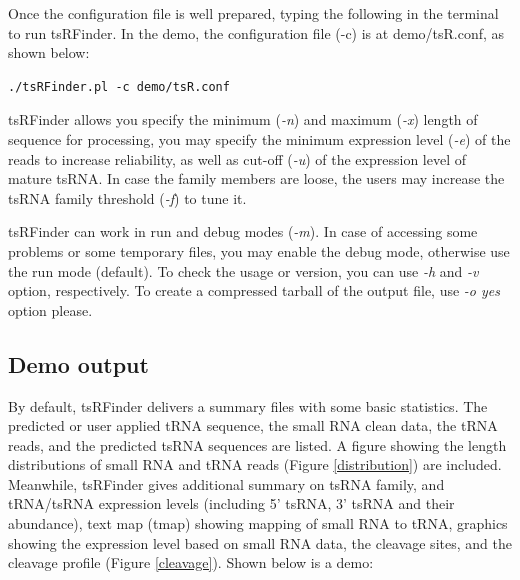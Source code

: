 \documentclass[11pt, a4paper]{article}
\begin{document}
Once the configuration file is well prepared, typing the following in the terminal to run tsRFinder. In the demo, the configuration file (-c) is at demo/tsR.conf, as shown below:

{\footnotesize \begin{tcolorbox}[colback=blue!5!white,colframe=blue!75!black,title=Running tsRFinder demo]
\begin{verbatim}
./tsRFinder.pl -c demo/tsR.conf
\end{verbatim}
\end{tcolorbox}}

tsRFinder allows you specify the minimum (\emph{-n}) and maximum (\emph{-x}) length of sequence for processing, you may specify the minimum expression level (\emph{-e}) of the reads to increase reliability, as well as cut-off (\emph{-u}) of the expression level of mature tsRNA. In case the family members are loose, the users may increase the tsRNA family threshold (\emph{-f}) to tune it.

tsRFinder can work in run and debug modes (\emph{-m}). In case of accessing some problems or some temporary files, you may enable the debug mode, otherwise use the run mode (default). To check the usage or version, you can use \emph{-h} and \emph{-v} option, respectively. To create a compressed tarball of the output file, use \emph{-o yes} option please.

\subsection{Demo output}

By default, tsRFinder delivers a summary files with some basic statistics. The predicted or user applied tRNA sequence, the small RNA clean data, the tRNA reads, and the predicted tsRNA sequences are listed. A figure showing the length distributions of small RNA and tRNA reads (Figure \ref{distribution}) are included. Meanwhile, tsRFinder gives additional summary on tsRNA family, and tRNA/tsRNA expression levels (including 5' tsRNA, 3' tsRNA and their abundance), text map (tmap) showing mapping of small RNA to tRNA, graphics showing the expression level based on small RNA data, the cleavage sites, and the cleavage profile (Figure \ref{cleavage}).
Shown below is a demo:
\end{document}
